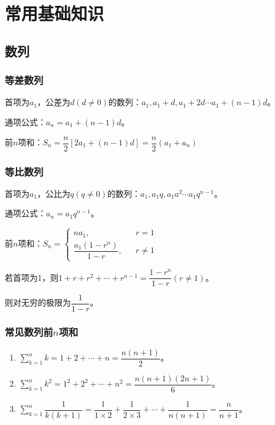 \documentclass[UTF8, 12pt]{ctexart}
\begin{document}
        \section{常用基础知识}
        \subsection{数列}
        \subsubsection{等差数列}

        首项为$a_1$，公差为$d(d\neq 0)$的数列：$a_1,a_1+d,a_1+2d\cdots a_1+(n-1)d$。

        通项公式：$a_n=a_1+(n-1)d$。

        前$n$项和：$S_n=\dfrac{n}{2}[2a_1+(n-1)d]=\dfrac{n}{2}(a_1+a_n)$

        \subsubsection{等比数列}

        首项为$a_1$，公比为$q(q\neq 0)$的数列：$a_1,a_1q,a_1a^2\cdots a_1q^{n-1}$。

        通项公式：$a_n=a_1q^{n-1}$。

        前$n$项和：$S_n=
        \left\{
        \begin{array}{lcl}
            na_1,                   &  & r=1     \\
            \dfrac{a_1(1-r^n)}{1-r}, &  & r\neq 1
        \end{array}
        \right.$

        若首项为1，则$1+r+r^2+\cdots+r^{n-1}=\dfrac{1-r^n}{1-r}(r\neq 1)$。

        则对无穷的极限为$\dfrac{1}{1-r}$。

        \subsubsection{常见数列前\texorpdfstring{$n$}n项和}

        \begin{enumerate}
            \item $\sum_{k=1}^nk=1+2+\cdots+n=\dfrac{n(n+1)}{2}$。
            \item $\sum_{k=1}^nk^2=1^2+2^2+\cdots+n^2=\dfrac{n(n+1)(2n+1)}{6}$。
            \item $\sum_{k=1}^n\dfrac{1}{k(k+1)}=\dfrac{1}{1\times 2}+\dfrac{1}{2\times 3}+\cdots+\dfrac{1}{n(n+1)}=\dfrac{n}{n+1}$。
        \end{enumerate}
\end{document}
